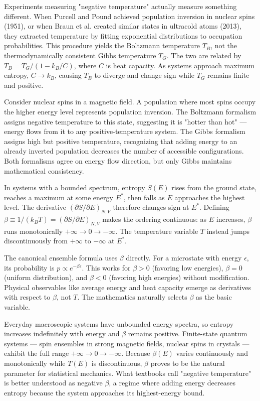 Experiments measuring "negative temperature" actually measure something different. When Purcell and Pound achieved population inversion in nuclear spins (1951), or when Braun et al. created similar states in ultracold atoms (2013), they extracted temperature by fitting exponential distributions to occupation probabilities. This procedure yields the Boltzmann temperature $T_B$, not the thermodynamically consistent Gibbs temperature $T_G$. The two are related by $T_B = T_G/(1 - k_B/C)$, where $C$ is heat capacity. As systems approach maximum entropy, $C \to k_B$, causing $T_B$ to diverge and change sign while $T_G$ remains finite and positive.

Consider nuclear spins in a magnetic field. A population where most spins occupy the higher energy level represents population inversion. The Boltzmann formalism assigns negative temperature to this state, suggesting it is "hotter than hot" — energy flows from it to any positive-temperature system. The Gibbs formalism assigns high but positive temperature, recognizing that adding energy to an already inverted population decreases the number of accessible configurations. Both formalisms agree on energy flow direction, but only Gibbs maintains mathematical consistency.

In systems with a bounded spectrum, entropy $S(E)$ rises from the ground state, reaches a maximum at some energy $E^\ast$, then falls as $E$ approaches the highest level. The derivative $\left(\partial S/\partial E\right)_{N,V}$ therefore changes sign at $E^\ast$. Defining $\beta \equiv 1/(k_B T)=\left(\partial S/\partial E\right)_{N,V}$ makes the ordering continuous: as $E$ increases, $\beta$ runs monotonically $+\infty \to 0 \to -\infty$. The temperature variable $T$ instead jumps discontinuously from $+\infty$ to $-\infty$ at $E^\ast$.

The canonical ensemble formula uses $\beta$ directly. For a microstate with energy $\epsilon$, its probability is $p \propto e^{-\beta \epsilon}$. This works for $\beta>0$ (favoring low energies), $\beta=0$ (uniform distribution), and $\beta<0$ (favoring high energies) without modification. Physical observables like average energy and heat capacity emerge as derivatives with respect to $\beta$, not $T$. The mathematics naturally selects $\beta$ as the basic variable.

Everyday macroscopic systems have unbounded energy spectra, so entropy increases indefinitely with energy and $\beta$ remains positive. Finite-state quantum systems — spin ensembles in strong magnetic fields, nuclear spins in crystals — exhibit the full range $+\infty \to 0 \to -\infty$. Because $\beta(E)$ varies continuously and monotonically while $T(E)$ is discontinuous, $\beta$ proves to be the natural parameter for statistical mechanics. What textbooks call "negative temperature" is better understood as negative $\beta$, a regime where adding energy decreases entropy because the system approaches its highest-energy bound.

